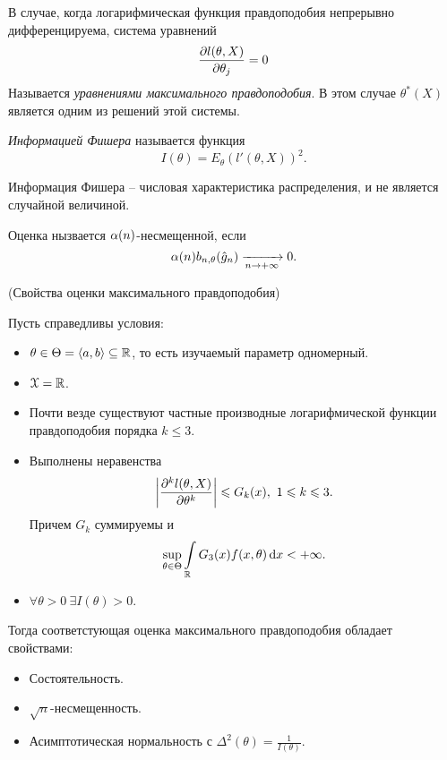\begin{definition}
    В случае, когда логарифмическая функция правдоподобия непрерывно 
    дифференцируема, система уравнений
    \[
        \pderv{l(\theta, X)}{\theta_j} = 0
    \]
    Называется \textit{уравнениями максимального правдоподобия}. В этом случае
    $\theta^*(X)$ является одним из решений этой системы.
\end{definition}

\begin{definition}
    \textit{Информацией Фишера} называется функция
    \[
        I(\theta) = E_\theta(l'(\theta, X))^2
    .\]
\end{definition}

\begin{remark}
    Информация Фишера -- числовая характеристика распределения, и не является
    случайной величиной.
\end{remark}

\begin{definition}
    Оценка нызвается $\a(n)$-несмещенной, если
    \[
        \a(n) b_{n, \theta}(\hat{g}_n) \xrightarrow[n \to +\infty]{} 0
    .\]
\end{definition}

\begin{theorem}(Свойства оценки максимального правдоподобия)
    
    Пусть справедливы условия:
    \begin{itemize}
        \item $\theta \in \Theta = \langle a, b \rangle \subseteq \R$, 
            то есть изучаемый параметр одномерный.
        \item $\cX = \R$.
        \item Почти везде существуют частные производные логарифмической
            функции правдоподобия порядка $k \leqslant 3$.
        \item Выполнены неравенства
            \[
                \abs*{\hderv{k}{l(\theta, X)}{\theta^k}} \leqslant G_k(x),~ 1 
                \leqslant k \leqslant 3 
            .\]
            Причем $G_k$ суммируемы и 
            \[
                \sup_{\theta \in \Theta}{\intl_\R{G_3(x) f(x, \theta) \dd x}} 
                < +\infty
            .\]
        \item $\forall \theta > 0~ \exists I(\theta) > 0$.
    \end{itemize}
    Тогда соответстующая оценка максимального правдоподобия обладает свойствами:
    \begin{itemize}
        \item Состоятельность.
        \item $\sqrt{n}$-несмещенность.
        \item Асимптотическая нормальность с $\displaystyle \Delta^2(\theta) = 
            \frac{1}{I(\theta)}$.
    \end{itemize}
\end{theorem}


